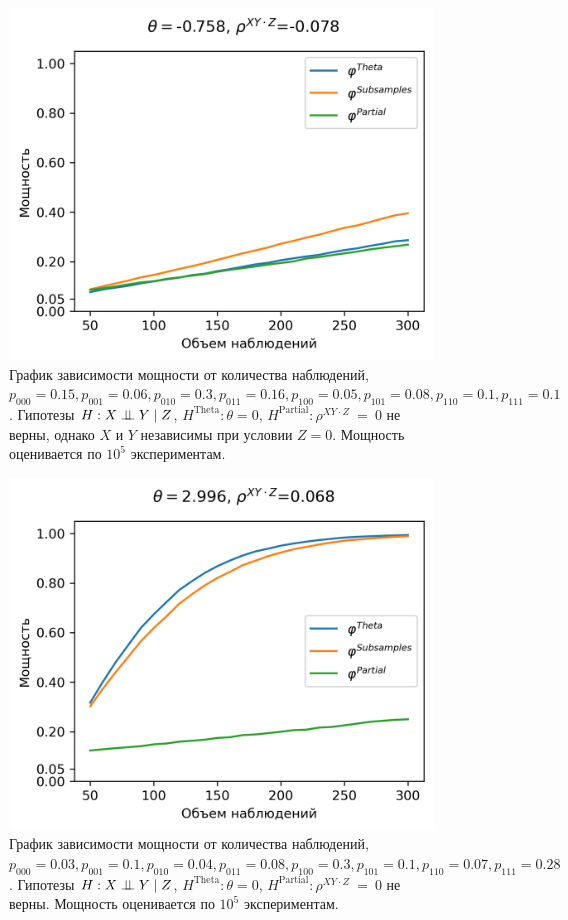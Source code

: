 \begin{figure}[H]
    \centering
    \includegraphics[scale=0.65]{images/graph3.png}
    \caption{График зависимости мощности от количества наблюдений,
    $p_{000}=0.15, p_{001}=0.06, 
    p_{010}=0.3, p_{011}=0.16,
    p_{100}=0.05, p_{101}=0.08, p_{110}=0.1, p_{111}=0.1$. 
    Гипотезы $H: X \perp\!\!\!\perp Y \mid Z$,
    $H^{\text{Theta}}: \theta=0$, 
    $H^{\text{Partial}}: \rho^{XY\cdot Z}~=~0$
    не верны,
    однако $X$ и $Y$ независимы
    при условии $Z=0$. 
    Мощность оценивается по $10^5$ экспериментам.}\label{fig:3}
\end{figure}

\begin{figure}[H]
    \centering
    \includegraphics[scale=0.65]{images/graph6.png}
    \caption{График зависимости мощности от количества наблюдений,
    $p_{000}=0.03, p_{001}=0.1, 
    p_{010}=0.04, p_{011}=0.08,
    p_{100}=0.3, p_{101}=0.1, p_{110}=0.07, p_{111}=0.28$. 
    Гипотезы $H: X \perp\!\!\!\perp Y \mid Z$,
    $H^{\text{Theta}}: \theta=0$, 
    $H^{\text{Partial}}: \rho^{XY\cdot Z}~=~0$
    не верны.
    Мощность оценивается по $10^5$ экспериментам.} \label{fig:6}
\end{figure}

